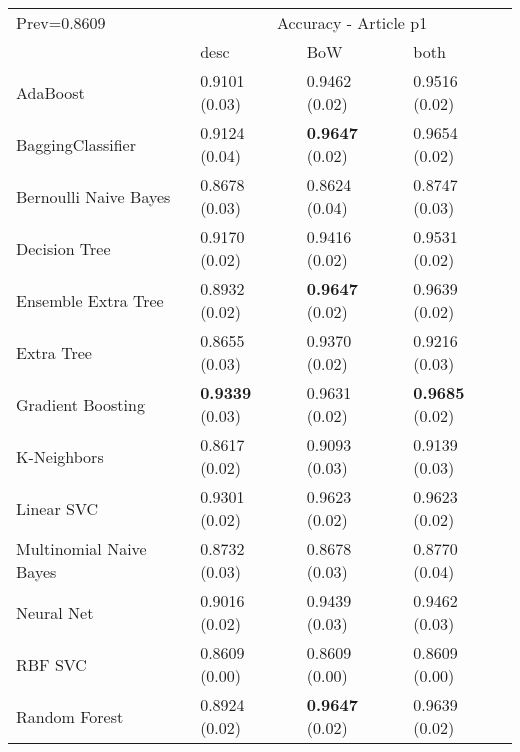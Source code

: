 \begin{tabular}{|l|l|l|l| }
\hline
Prev=0.8609 &  \multicolumn{3}{c|}{Accuracy - Article p1} \\
\cline{2-4} & desc & BoW & both \\ \hline
AdaBoost                & 0.9101 (0.03) & 0.9462 (0.02) & 0.9516 (0.02)\\
BaggingClassifier       & 0.9124 (0.04) & {\bf 0.9647} (0.02) & 0.9654 (0.02)\\
Bernoulli Naive Bayes   & 0.8678 (0.03) & 0.8624 (0.04) & 0.8747 (0.03)\\
Decision Tree           & 0.9170 (0.02) & 0.9416 (0.02) & 0.9531 (0.02)\\
Ensemble Extra Tree     & 0.8932 (0.02) & {\bf 0.9647} (0.02) & 0.9639 (0.02)\\
Extra Tree              & 0.8655 (0.03) & 0.9370 (0.02) & 0.9216 (0.03)\\
Gradient Boosting       & {\bf 0.9339} (0.03) & 0.9631 (0.02) & {\bf 0.9685} (0.02)\\
K-Neighbors             & 0.8617 (0.02) & 0.9093 (0.03) & 0.9139 (0.03)\\
Linear SVC              & 0.9301 (0.02) & 0.9623 (0.02) & 0.9623 (0.02)\\
Multinomial Naive Bayes & 0.8732 (0.03) & 0.8678 (0.03) & 0.8770 (0.04)\\
Neural Net              & 0.9016 (0.02) & 0.9439 (0.03) & 0.9462 (0.03)\\
RBF SVC                 & 0.8609 (0.00) & 0.8609 (0.00) & 0.8609 (0.00)\\
Random Forest           & 0.8924 (0.02) & {\bf 0.9647} (0.02) & 0.9639 (0.02)\\
\hline
\end{tabular}